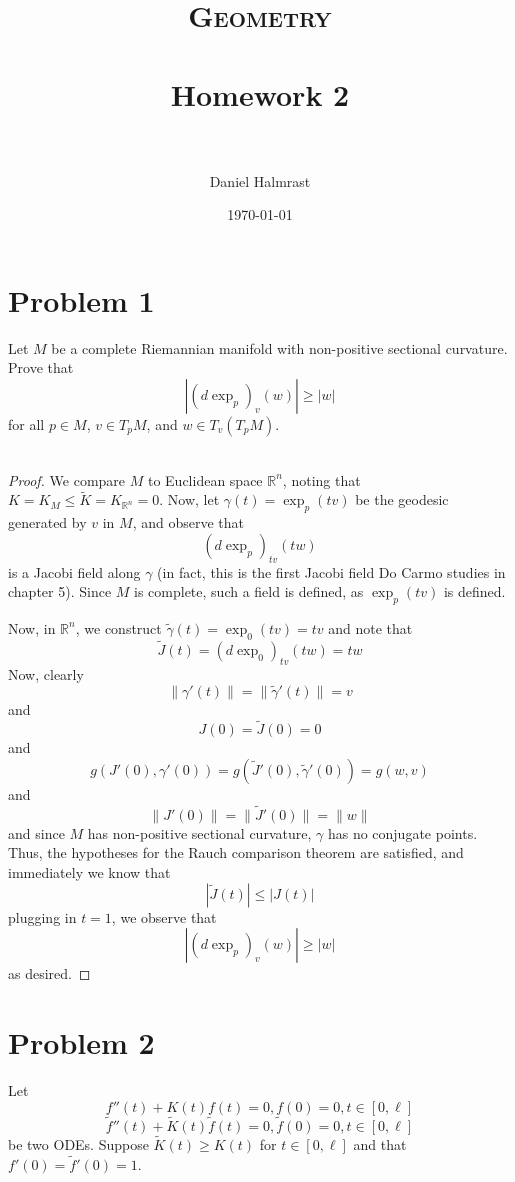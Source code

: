 \documentclass[fontsize=11pt]{scrartcl} %
\title{	
\normalfont \normalsize 
\textsc{Geometry} \\ [25pt] %
\horrule{0.5pt} \\[0.4cm] %
\huge Homework 2 \\ %
\horrule{2pt} \\[0.5cm] %
}
\author{Daniel Halmrast} %
\date{\normalsize\today} %
\numberwithin{equation}{section} %
\numberwithin{figure}{section} %
\numberwithin{table}{section} %
\newcommand{\R}{\mathbb{R}}
\begin{document}
\maketitle %

\section*{Problem 1}
Let $M$ be a complete Riemannian manifold with non-positive sectional curvature.
Prove that
\[
    |(d\exp_p)_v(w)|\geq |w|
\]
for all $p\in M$, $v\in T_pM$, and $w\in T_v(T_pM)$.
\\
\\
\begin{proof}
    We compare $M$ to Euclidean space $\R^n$, noting that $K = K_M \leq
    \tilde{K} = K_{\R^n} = 0$. Now, let $\gamma(t) = \exp_p(tv)$ be the geodesic
    generated by $v$ in $M$, and observe that
    \[
        (d\exp_p)_{tv}(tw)
    \]
    is a Jacobi field along $\gamma$ (in fact, this is the first Jacobi field Do
    Carmo studies in chapter 5). Since $M$ is complete, such a field is defined,
    as $\exp_p(tv)$ is defined.

    Now, in $\R^n$, we construct $\tilde{\gamma}(t) = \exp_0(tv) = tv$ and
    note that
    \[
        \tilde{J}(t) = (d\exp_0)_{tv}(tw) = tw
    \]
    Now, clearly
    \[
        \|\gamma'(t)\| = \|\tilde{\gamma}'(t)\| = v
    \]
    and
    \[
        J(0) = \tilde{J}(0) = 0
    \]
    and
    \[
        g(J'(0),\gamma'(0)) = g(\tilde{J}'(0),\tilde{\gamma}'(0)) = g(w,v)
    \]
    and
    \[
        \|J'(0)\| = \|\tilde{J}'(0)\| = \|w\|
    \]
    and since $M$ has non-positive sectional curvature, $\gamma$ has no
    conjugate points. Thus, the hypotheses for the Rauch comparison theorem are
    satisfied, and immediately we know that
    \[
        |\tilde{J}(t)| \leq |J(t)|
    \]
    plugging in $t=1$, we observe that
    \[
        |(d\exp_p)_{v}(w)| \geq |w|
    \]
    as desired.
\end{proof}

\newpage

\section*{Problem 2}
Let
\[
    f''(t) + K(t)f(t) = 0, f(0)=0, t\in [0,\ell]
\]
\[
    \tilde{f}''(t) + \tilde{K}(t)\tilde{f}(t) = 0, \tilde{f}(0)=0, t\in [0,\ell]
\]
be two ODEs. Suppose $\tilde{K}(t)\geq K(t)$ for $t\in[0,\ell]$ and that
$f'(0)=\tilde{f}'(0)=1$.
\end{document}
